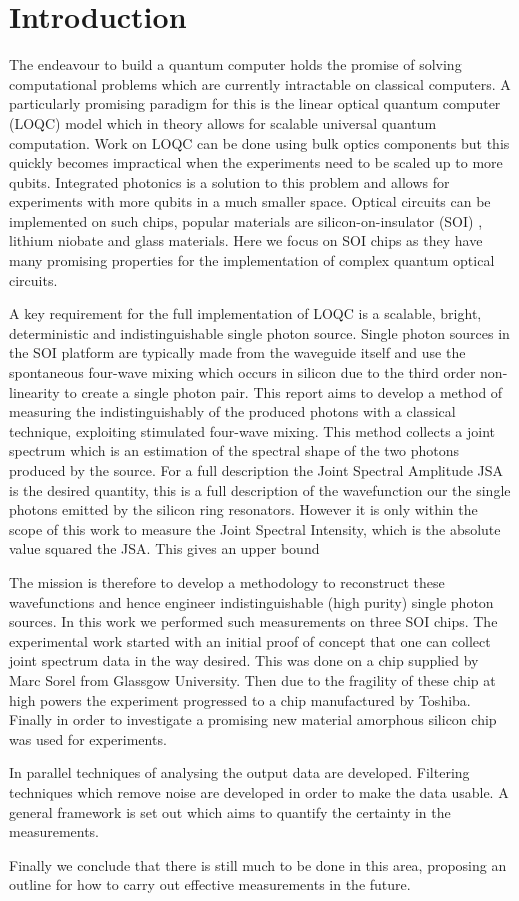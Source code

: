 \newpage
\section{Introduction}
The endeavour to build a quantum computer holds the promise of solving computational problems which are currently intractable on classical computers. A particularly promising paradigm for this is the linear optical quantum computer (LOQC) model which in theory allows for scalable universal quantum computation. Work on LOQC can be done using bulk optics components but this quickly becomes impractical when the experiments need to be scaled up to more qubits. Integrated photonics is a solution to this problem and allows for experiments with more qubits in a much smaller space. Optical circuits can be implemented on such chips, popular materials are silicon-on-insulator (SOI) , lithium niobate and glass materials. Here we focus on SOI chips as they have many promising properties for the implementation of complex quantum optical circuits.

A key requirement for the full implementation of LOQC is a scalable, bright, deterministic and indistinguishable single photon source. Single photon sources in the SOI platform are typically made from the waveguide itself and use the spontaneous four-wave mixing which occurs in silicon due to the third order non-linearity to create a single photon pair. This report aims to develop a method of measuring the indistinguishably of the produced photons with a classical technique, exploiting stimulated four-wave mixing. This method collects a joint spectrum which is an estimation of the spectral shape of the two photons produced by the source. For a full description the Joint Spectral Amplitude JSA is the desired quantity, this is a full description of the wavefunction our the single photons emitted by the silicon ring resonators. However it is only within the scope of this work to measure the Joint Spectral Intensity, which is the absolute value squared the JSA. This gives an upper bound 

The mission is therefore to develop a methodology to reconstruct these wavefunctions and hence engineer indistinguishable (high purity) single photon sources. In this work we performed such measurements on three SOI chips. The experimental work started with an initial proof of concept that one can collect joint spectrum data in the way desired. This was done on a chip supplied by Marc Sorel from Glassgow University. Then due to the fragility of these chip at high powers the experiment progressed to a chip manufactured by Toshiba. Finally in order to investigate a promising new material amorphous silicon chip was used for experiments. 

In parallel techniques of analysing the output data are developed. Filtering techniques which remove noise are developed in order to make the data usable. A general framework is set out which aims to quantify the certainty in the measurements.

Finally we conclude that there is still much to be done in this area, proposing an outline for how to carry out effective measurements in the future.


